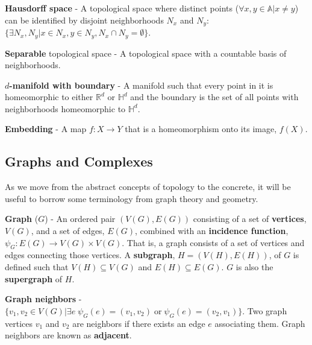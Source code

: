 \begin{defn}
  \textbf{Hausdorff space} - A topological space where distinct points (${\forall x,y \in \mathbb{A} | x \neq y}$) can be identified by disjoint neighborhoods $N_x$ and $N_y$: $\{\exists N_x,N_y | x \in N_x, y \in N_y, N_x \cap N_y = \emptyset\}$.
\end{defn}
\begin{defn}
  \textbf{Separable} topological space - A topological space with a countable
  basis of neighborhoods.
\end{defn}
\begin{defn}
  \textbf{$d$-manifold with boundary} - A manifold such that every point in
  it is homeomorphic to either $\mathbb{R}^d$ or $\mathbb{H}^d$ and the boundary
  is the set of all points with neighborhoods homeomorphic to $\mathbb{H}^d$.
\end{defn}

\begin{defn}
  \textbf{Embedding} - A map $f : X \rightarrow Y$ that is a homeomorphism onto
  its image, $f(X)$.
\end{defn}

\subsection{Graphs and Complexes}

As we move from the abstract concepts of topology to the concrete, it will be useful to borrow some terminology from graph theory and geometry.

\begin{defn}
  \textbf{Graph} ($G$) - An ordered pair $(V(G),E(G))$ consisting of a set of
  \textbf{vertices}, $V(G)$, and a set of edges, $E(G)$, combined with an
  \textbf{incidence function}, $\psi_G : E(G) \rightarrow V(G) \times V(G)$.
  That is, a graph consists of a set of vertices and edges connecting those
  vertices. A \textbf{subgraph}, $H = (V(H),E(H))$, of $G$ is defined such that
  $V(H) \subseteq V(G)$ and $E(H) \subseteq E(G)$. $G$ is also the
  \textbf{supergraph} of $H$.
\end{defn}

\begin{defn}
  \textbf{Graph neighbors} - $\{v_1,v_2 \in V(G) | \exists e\; \psi_G(e) = (v_1,v_2) \;\text{or}\; \psi_G(e) = (v_2,v_1) \}$. Two graph vertices $v_1$ and $v_2$ are neighbors if there exists an edge $e$ associating them. Graph neighbors are known as \textbf{adjacent}.
\end{defn}

